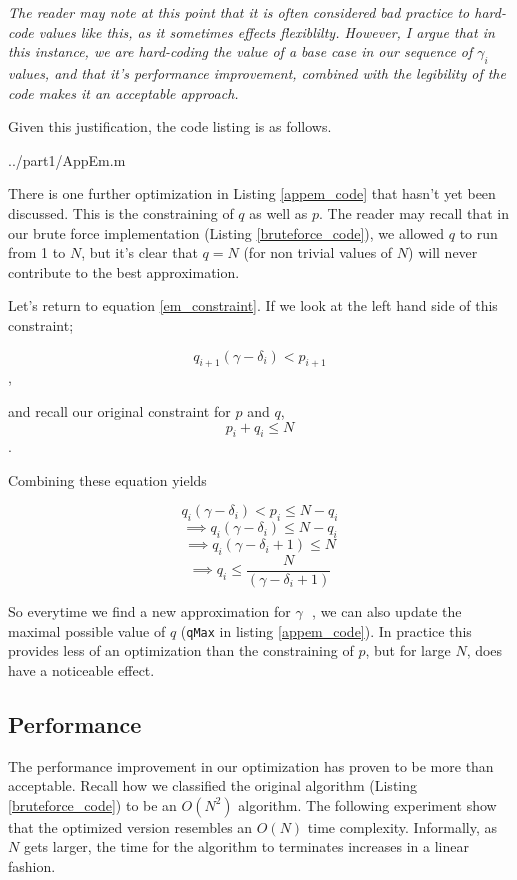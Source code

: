 \documentclass[10pt]{article}
\newcommand*{\gam}{$\gamma \text{ }$}
\newcommand*{\gami}{$\gamma_{i} \text{ }$}
\begin{document}
\emph{The reader may note at this point that it is often considered bad practice to hard-code values like this, as it sometimes effects flexiblilty. However, I argue that in this instance, we are hard-coding the value of a base case in our sequence of \gami values, and that it's performance improvement, combined with the legibility of the code makes it an acceptable approach.}

Given this justification, the code listing is as follows.

   {../part1/AppEm.m}

There is one further optimization in Listing \ref{appem_code} that hasn't yet been discussed. This is the constraining of $q$ as well as $p$. The reader may recall that in our brute force implementation (Listing \ref{bruteforce_code}), we allowed $q$ to run from 1 to $N$, but it's clear that $q = N$ (for non trivial values of $N$) will never contribute to the best approximation.

Let's return to equation \ref{em_constraint}. If we look at the left hand side of this constraint;

$$q_{i+1} (\gamma - \delta_i) < p_{i+1} $$,

and recall our original constraint for $p$ and $q$,
$$ p_i + q_i \leq N $$.

Combining these equation yields

$$ q_i (\gamma - \delta_i) < p_i \leq N - q_i $$ 
$$ \implies  q_i (\gamma - \delta_i) \leq N - q_i $$ 
$$ \implies q_i (\gamma - \delta_i + 1) \leq N  $$ 
$$ \implies q_i  \leq \frac{N}{(\gamma - \delta_i + 1)}  $$ 

So everytime we find a new approximation for \gam, we can also update the maximal possible value of $q$ (\texttt{qMax} in listing \ref{appem_code}). In practice this provides less of an optimization than the constraining of $p$, but for large $N$, does have a noticeable effect.

\subsection{Performance}

The performance improvement in our optimization has proven to be more than acceptable. Recall how we classified the original algorithm (Listing \ref{bruteforce_code}) to be an $O(N^2)$ algorithm. The following experiment show that the optimized version resembles an $O(N)$ time complexity. Informally, as $N$ gets larger, the time for the algorithm to terminates increases in a linear fashion.
\end{document}
